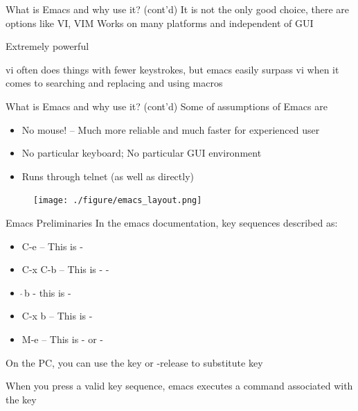 \documentclass[newPxFont,sthlmFooter,nooffset]{beamer}
\begin{document}
\begin{frame}[t]{What is Emacs and why use it? (cont'd)}
It is not the only good choice, there are options like VI, VIM Works on many platforms and independent of GUI

\bigskip
Extremely powerful

\bigskip
vi often does things with fewer keystrokes, but emacs easily surpass vi when it comes to searching and replacing and using macros

\end{frame}

\begin{frame}[t]{What is Emacs and why use it? (cont'd)}
Some of assumptions of Emacs are
\begin{itemize}
\item No mouse! – Much more reliable and much faster for experienced user
\item No particular keyboard; No particular GUI environment
\item Runs through telnet (as well as directly)
\end{itemize}
\end{frame}




\begin{frame}[t]{}
\begin{figure}\centering
  \texttt{[image: ./figure/emacs\_layout.png]}
\end{figure}
\end{frame}




\begin{frame}[t]{Emacs Preliminaries}
In the emacs documentation, key sequences described as:
\begin{itemize}
\item C-e – This is -
\item C-x C-b – This is - -
\item $\hat{~}$b - this is - \
\item C-x b – This is - 
\item M-e – This is \keystroke{Meta}-\keystroke{e} or -
\end{itemize}

\bigskip
On the PC, you can use the  key or -release to substitute  key

\bigskip
When you press a valid key sequence, emacs executes a command associated with the key
\end{frame}
\end{document}
